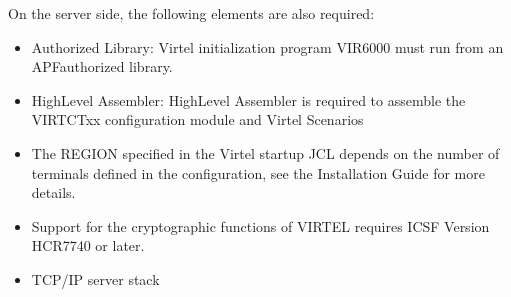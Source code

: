 \documentclass[letterpaper,10pt,english]{sphinxmanual}
\begin{document}
\sphinxAtStartPar
On the server side, the following elements are also required:
\begin{itemize}
\item {} 
\sphinxAtStartPar
Authorized Library: Virtel initialization program VIR6000 must run from an APF\sphinxhyphen{}authorized library.

\item {} 
\sphinxAtStartPar
High\sphinxhyphen{}Level Assembler: High\sphinxhyphen{}Level Assembler is required to assemble the VIRTCTxx configuration module and Virtel Scenarios

\item {} 
\sphinxAtStartPar
The REGION specified in the Virtel startup JCL depends on the number of terminals defined in the configuration, see the Installation Guide for more details.

\item {} 
\sphinxAtStartPar
Support for the cryptographic functions of VIRTEL requires ICSF Version HCR7740 or later.

\item {} 
\sphinxAtStartPar
TCP/IP server stack

\end{itemize}

\sphinxAtStartPar
{}
\end{document}

